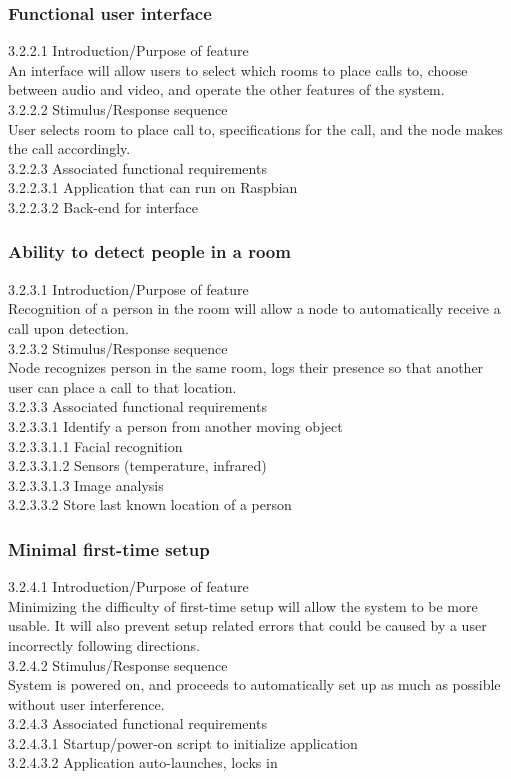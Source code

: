 \documentclass[onecolumn, draftclsnofoot,10pt, compsoc]{IEEEtran}
\newcommand\tab[1][1cm]{\hspace*{#1}}
\begin{document}
\subsubsection{Functional user interface}
\tab 3.2.2.1  Introduction/Purpose of feature \\
\tab An interface will allow users to select which rooms to place calls to, choose between audio and video, and operate the other features of the system. \\
\tab 3.2.2.2  Stimulus/Response sequence \\
\tab User selects room to place call to, specifications for the call, and the node makes the call accordingly. \\
\tab 3.2.2.3  Associated functional requirements \\
\tab \tab 3.2.2.3.1  Application that can run on Raspbian \\
\tab \tab 3.2.2.3.2  Back-end for interface 

\subsubsection{Ability to detect people in a room}
\tab 3.2.3.1  Introduction/Purpose of feature \\
\tab Recognition of a person in the room will allow a node to automatically receive a call upon detection. \\
\tab 3.2.3.2  Stimulus/Response sequence \\
Node recognizes person in the same room, logs their presence so that another user can place a call to that location. \\
\tab 3.2.3.3  Associated functional requirements \\
\tab \tab 3.2.3.3.1  Identify a person from another moving object \\
\tab \tab \tab 3.2.3.3.1.1  Facial recognition \\
\tab \tab \tab 3.2.3.3.1.2  Sensors (temperature, infrared) \\
\tab \tab \tab 3.2.3.3.1.3  Image analysis \\ 
\tab \tab 3.2.3.3.2  Store last known location of a person

\subsubsection{Minimal first-time setup}
\tab 3.2.4.1  Introduction/Purpose of feature \\
\tab Minimizing the difficulty of first-time setup will allow the system to be more usable. It will also prevent setup related errors that could be caused by a user incorrectly following directions. \\
\tab 3.2.4.2  Stimulus/Response sequence \\
\tab System is powered on, and proceeds to automatically set up as much as possible without user interference. \\
\tab 3.2.4.3  Associated functional requirements \\
\tab \tab 3.2.4.3.1  Startup/power-on script to initialize application \\
\tab \tab 3.2.4.3.2  Application auto-launches, locks in 
\end{document}

